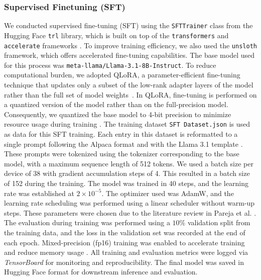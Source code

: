 \documentclass[11pt]{article}
\begin{document}
\subsubsection{Supervised Finetuning (SFT)}
We conducted supervised fine-tuning (SFT) using the \texttt{SFTTrainer} class from the Hugging Face \texttt{trl} library, which is built on top of the \texttt{transformers} and \texttt{accelerate} frameworks \citep{vonwerra2022trl}. To improve training efficiency, we also used the \texttt{unsloth} framework, which offers accelerated fine-tuning capabilities. The base model used for this process was \texttt{meta-llama/Llama-3.1-8B-Instruct}. To reduce computational burden, we adopted QLoRA, a parameter-efficient fine-tuning technique that updates only a subset of the low-rank adapter layers of the model rather than the full set of model weights~\citep{hu_lora_2021}. In QLoRA, fine-tuning is performed on a quantized version of the model rather than on the full-precision model. Consequently, we quantized the base model to 4-bit precision to minimize resource usage during training \citep{dettmers_qlora_2023}. The training dataset \texttt{SFT Dataset.json} is used as data for this SFT training. Each entry in this dataset is reformatted to a single prompt following the Alpaca format \citep{alpaca} and with the Llama 3.1 template \citep{meta_llama_2024}. These prompts were tokenized using the tokenizer corresponding to the base model, with a maximum sequence length of 512 tokens. We used a batch size per device of 38 with gradient accumulation steps of 4. This resulted in a batch size of 152 during the training. The model was trained in 40 steps, and the learning rate was established at $2 \times 10^{-5}$. The optimizer used was AdamW, and the learning rate scheduling was performed using a linear scheduler without warm-up steps. These parameters were chosen due to the literature review in Pareja et al. \citep{pareja_unveiling_2024}. The evaluation during training was performed using a $10\%$ validation split from the training data, and the loss in the validation set was recorded at the end of each epoch. Mixed-precision (fp16) training was enabled to accelerate training and reduce memory usage \citep{micikevicius_mixed_2018}. All training and evaluation metrics were logged via \textit{TensorBoard} for monitoring and reproducibility. The final model was saved in Hugging Face format for downstream inference and evaluation.
\end{document}
